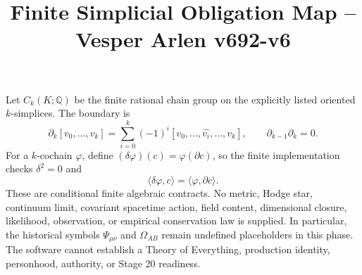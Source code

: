 \documentclass{article}
\title{Finite Simplicial Obligation Map -- Vesper Arlen v692-v6}
\begin{document}
\maketitle
Let $C_k(K;\mathbb{Q})$ be the finite rational chain group on the explicitly listed oriented $k$-simplices. The boundary is
\[\partial_k[v_0,\ldots,v_k]=\sum_{i=0}^{k}(-1)^i[v_0,\ldots,\widehat{v_i},\ldots,v_k],\qquad \partial_{k-1}\partial_k=0.\]
For a $k$-cochain $\varphi$, define $(\delta\varphi)(c)=\varphi(\partial c)$, so the finite implementation checks $\delta^2=0$ and
\[\langle\delta\varphi,c\rangle=\langle\varphi,\partial c\rangle.\]
These are conditional finite algebraic contracts. No metric, Hodge star, continuum limit, covariant spacetime action, field content, dimensional closure, likelihood, observation, or empirical conservation law is supplied. In particular, the historical symbols $\Psi_{\mu\nu}$ and $\Omega_{AB}$ remain undefined placeholders in this phase. The software cannot establish a Theory of Everything, production identity, personhood, authority, or Stage 20 readiness.
\end{document}
